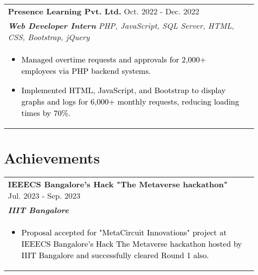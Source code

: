 \documentclass[a4paper,8pt]{article}
\begin{document}
\begin{tabularx}{\linewidth}{ @{}l r@{} }
\color[HTML]{1C033C} \textbf{Presence Learning Pvt. Ltd.} \hfill \color[HTML]{371e77}Oct. 2022 - Dec. 2022 \\[4pt]
\color[HTML]{371e77}\textbf{\textit{Web Developer Intern}} \hfill \color[HTML]{4B28A4} \textit{PHP, JavaScript, SQL Server, HTML, CSS, Bootstrap, jQuery} \\[5pt]
\begin{minipage}[t]{\linewidth}
    \begin{itemize}[nosep,after=\strut, leftmargin=2em, itemsep=2pt]
        \item \textcolor{black}{{Managed overtime requests and approvals for 2,000+ employees via PHP backend systems.}}
        \item \textcolor{black}{{Implemented HTML, JavaScript, and Bootstrap to display graphs and logs for 6,000+ monthly requests, reducing loading times by 70\%.}}
    \end{itemize}
\end{minipage}
\end{tabularx}



\vspace{10pt} %

\section{Achievements}

\begin{tabularx}{\linewidth}{ @{}l r@{} }
\color[HTML]{1C033C} \textbf{ IEEECS Bangalore's Hack "The Metaverse hackathon"} \hfill \color[HTML]{371e77} Jul. 2023 - Sep. 2023 \\[3pt]
\color[HTML]{371e77}\textbf{\textit{IIIT Bangalore}} \\[3pt]
\begin{minipage}[t]{\linewidth}
    \begin{itemize}[nosep,after=\strut, leftmargin=2em, itemsep=2pt]
        \item \textcolor{black} {Proposal accepted for "MetaCircuit Innovations" project at IEEECS Bangalore's Hack The Metaverse hackathon hosted by IIIT Bangalore and successfully cleared Round 1 also.}
    \end{itemize}
\end{minipage}
\end{tabularx}
\end{document}
